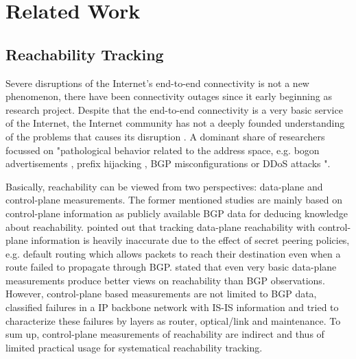 \section{Related Work 
\label{sec:related_work}} 
\subsection{Reachability
Tracking}

Severe disruptions of the Internet's end-to-end connectivity is not a new
phenomenon, there have been connectivity outages since it early beginning as
research project. Despite that the end-to-end connectivity is a very basic
service of the Internet, the Internet community has not a deeply founded
understanding of the problems that causes its disruption \citep{Bush:Optometry}.
A dominant share of researchers focussed on "pathological behavior related to
the address space, e.g. bogon advertisements \citep{Feamster:2005}, prefix
hijacking \citep{Zhang:2010}, BGP misconfigurations \citep{Mahajan:2002} or DDoS
attacks \citep{Chen:2001}"\citep{Bush:Optometry}.

Basically, reachability can be viewed from two perspectives: data-plane and
control-plane measurements. The former mentioned studies are mainly based on
control-plane information as publicly available BGP data for deducing knowledge
about reachability. \citet{Bush:Optometry} pointed out that tracking data-plane
reachability with control-plane information is heavily inaccurate due to the
effect of secret peering policies, e.g. default routing which allows packets to
reach their destination even when a route failed to propagate through BGP.
\citet{Bush:Optometry} stated that even very basic data-plane measurements
produce better views on reachability than BGP observations. However,
control-plane based measurements are not limited to BGP data,
\citet{Markopoulou:2008} classified failures in a IP backbone network with IS-IS
information and tried to characterize these failures by layers as router,
optical/link and maintenance. To sum up, control-plane measurements of
reachability are indirect and thus of limited practical usage for systematical
reachability tracking.

